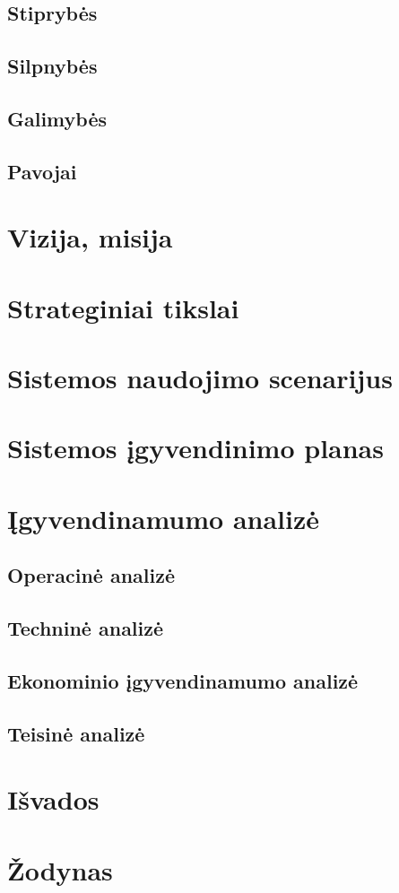 \documentclass[oneside]{VUMIFPSkursinis}
\begin{document}
	\subsection{Stiprybės}
	\subsection{Silpnybės}
	\subsection{Galimybės}
	\subsection{Pavojai}
\section{Vizija, misija}
\section{Strateginiai tikslai}
\section{Sistemos naudojimo scenarijus}
\section{Sistemos įgyvendinimo planas}
\section{Įgyvendinamumo analizė}
	\subsection{Operacinė analizė}
	\subsection{Techninė analizė}
	\subsection{Ekonominio įgyvendinamumo analizė}
	\subsection{Teisinė analizė}
\section{Išvados}
\section{Žodynas}
\end{document}
